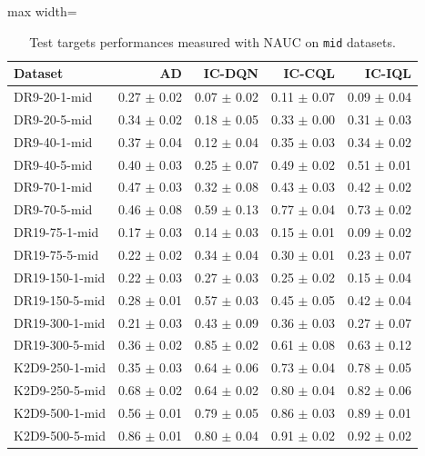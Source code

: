 \documentclass{article}
\begin{document}
\begin{table}[ht]
    \label{tab:}
    \begin{center}
    \caption{Test targets performances measured with NAUC on \texttt{mid} datasets.}
    \begin{small}
    \begin{adjustbox}{max width=\columnwidth}
		\begin{tabular}{l|rrrr}
		\toprule
	\textbf{Dataset} & \textbf{AD} & \textbf{IC-DQN} & \textbf{IC-CQL} & \textbf{IC-IQL}\\
\midrule
DR9-20-1-mid & 0.27 $\pm$ 0.02 & 0.07 $\pm$ 0.02 & 0.11 $\pm$ 0.07 & 0.09 $\pm$ 0.04\\
DR9-20-5-mid & 0.34 $\pm$ 0.02 & 0.18 $\pm$ 0.05 & 0.33 $\pm$ 0.00 & 0.31 $\pm$ 0.03\\
DR9-40-1-mid & 0.37 $\pm$ 0.04 & 0.12 $\pm$ 0.04 & 0.35 $\pm$ 0.03 & 0.34 $\pm$ 0.02\\
DR9-40-5-mid & 0.40 $\pm$ 0.03 & 0.25 $\pm$ 0.07 & 0.49 $\pm$ 0.02 & 0.51 $\pm$ 0.01\\
DR9-70-1-mid & 0.47 $\pm$ 0.03 & 0.32 $\pm$ 0.08 & 0.43 $\pm$ 0.03 & 0.42 $\pm$ 0.02\\
DR9-70-5-mid & 0.46 $\pm$ 0.08 & 0.59 $\pm$ 0.13 & 0.77 $\pm$ 0.04 & 0.73 $\pm$ 0.02\\
DR19-75-1-mid & 0.17 $\pm$ 0.03 & 0.14 $\pm$ 0.03 & 0.15 $\pm$ 0.01 & 0.09 $\pm$ 0.02\\
DR19-75-5-mid & 0.22 $\pm$ 0.02 & 0.34 $\pm$ 0.04 & 0.30 $\pm$ 0.01 & 0.23 $\pm$ 0.07\\
DR19-150-1-mid & 0.22 $\pm$ 0.03 & 0.27 $\pm$ 0.03 & 0.25 $\pm$ 0.02 & 0.15 $\pm$ 0.04\\
DR19-150-5-mid & 0.28 $\pm$ 0.01 & 0.57 $\pm$ 0.03 & 0.45 $\pm$ 0.05 & 0.42 $\pm$ 0.04\\
DR19-300-1-mid & 0.21 $\pm$ 0.03 & 0.43 $\pm$ 0.09 & 0.36 $\pm$ 0.03 & 0.27 $\pm$ 0.07\\
DR19-300-5-mid & 0.36 $\pm$ 0.02 & 0.85 $\pm$ 0.02 & 0.61 $\pm$ 0.08 & 0.63 $\pm$ 0.12\\
K2D9-250-1-mid & 0.35 $\pm$ 0.03 & 0.64 $\pm$ 0.06 & 0.73 $\pm$ 0.04 & 0.78 $\pm$ 0.05\\
K2D9-250-5-mid & 0.68 $\pm$ 0.02 & 0.64 $\pm$ 0.02 & 0.80 $\pm$ 0.04 & 0.82 $\pm$ 0.06\\
K2D9-500-1-mid & 0.56 $\pm$ 0.01 & 0.79 $\pm$ 0.05 & 0.86 $\pm$ 0.03 & 0.89 $\pm$ 0.01\\
K2D9-500-5-mid & 0.86 $\pm$ 0.01 & 0.80 $\pm$ 0.04 & 0.91 $\pm$ 0.02 & 0.92 $\pm$ 0.02\\

\end{tabular}
\end{adjustbox}
\end{small}
\end{center}
\end{table}
\end{document}
